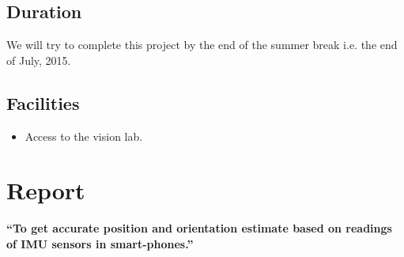 \documentclass{article}
\begin{document}
		\subsection{Duration}
			We will try to complete this project by the end of the summer break i.e. the end of July, 2015. 
		\subsection{Facilities}
		    \begin{itemize}
		    \item Access to the vision lab.
		    \end{itemize}
	\newpage
	\section{Report}
		\textbf{``To get accurate position and orientation estimate based on readings of IMU sensors in smart-phones.''}
		\\
\end{document}
